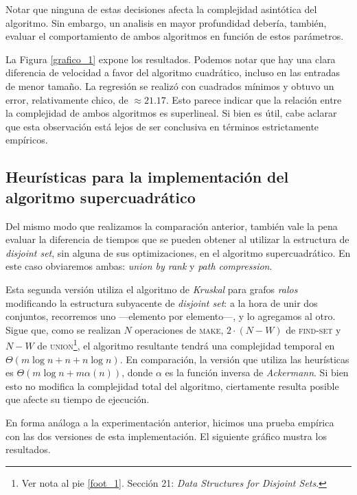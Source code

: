 Notar que ninguna de estas decisiones afecta la complejidad asintótica del algoritmo. Sin embargo, un analisis en mayor profundidad debería, también, evaluar el comportamiento de ambos algoritmos en función de estos parámetros.

La Figura \ref{grafico_1} expone los resultados. Podemos notar que hay una clara diferencia de velocidad a favor del algoritmo cuadrático, incluso en las entradas de menor tamaño. La regresión se realizó con cuadrados mínimos y obtuvo un error, relativamente chico, de $\approx 21.17$. Esto parece indicar que la relación entre la complejidad de ambos algoritmos es superlineal. Si bien es útil, cabe aclarar que esta observación está lejos de ser conclusiva en términos estrictamente empíricos. %

\subsection{Heurísticas para la implementación del algoritmo supercuadrático}

Del mismo modo que realizamos la comparación anterior, también vale la pena evaluar la diferencia de tiempos que se pueden obtener al utilizar la estructura de \textit{disjoint set}, sin alguna de sus optimizaciones, en el algoritmo supercuadrático. En este caso obviaremos ambas: \textit{union by rank} y \textit{path compression}. 

Esta segunda versión utiliza el algoritmo de \textit{Kruskal} para grafos \textit{ralos} modificando la estructura subyacente de \textit{disjoint set}: a la hora de unir dos conjuntos, recorremos uno ---elemento por elemento---, y lo agregamos al otro. {\color{red} Sigue que, como se realizan $N$ operaciones de \textsc{make}, $2\cdot(N-W)$ de \textsc{find-set} y $N-W$ de \textsc{union}\footnote{Ver nota al pie \ref{foot_1}. Sección 21: \textit{Data Structures for Disjoint Sets}.}, el algoritmo resultante tendrá una complejidad temporal en $\Theta(m\log n + n + n\log n)$}. En comparación, la versión que utiliza las heurísticas es $\Theta(m\log n + m\alpha(n))$, donde $\alpha$ es la función inversa de \textit{Ackermann}.  Si bien esto no modifica la complejidad total del algoritmo, ciertamente resulta posible que afecte su tiempo de ejecución.

En forma análoga a la experimentación anterior, hicimos una prueba empírica con las dos versiones de esta implementación. El siguiente gráfico mustra los resultados.

